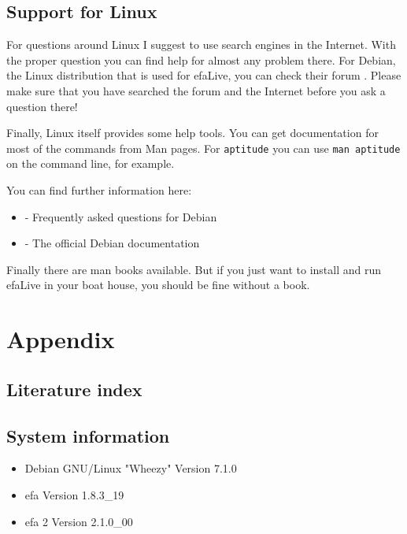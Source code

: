 \documentclass[a4paper,12pt,twoside]{article}
\begin{document}
\subsection{Support for Linux}
\label{support_linux}
For questions around Linux I suggest to use search engines in the
Internet. With the proper question you can find help for almost any
problem there. For Debian, the Linux distribution that is used for
efaLive, you can check their forum \cite{HLP1}. Please make sure that
you have searched the forum and the Internet before you ask a question
there!

Finally, Linux itself provides some help tools. You can get
documentation for most of the commands from Man pages. For
\texttt{aptitude} you can use \texttt{man
aptitude} on the command line, for example.

You can find further information here:

\begin{itemize}
    \item \cite{HLP2} - Frequently asked questions for Debian
    \item \cite{HLP3} - The official Debian documentation
\end{itemize}

Finally there are man books available. But if you just want to install
and run efaLive in your boat house, you should be fine without a book.


\clearpage
\section{Appendix}
\label{sct:appendix}
\subsection{Literature index}
\label{sct:literature}




\subsection{System information}
\label{sct:sysinfo}

\begin{itemize}
    \item Debian GNU/Linux "Wheezy" Version 7.1.0
    \item efa Version 1.8.3\_19
    \item efa 2 Version 2.1.0\_00
\end{itemize}
\end{document}
